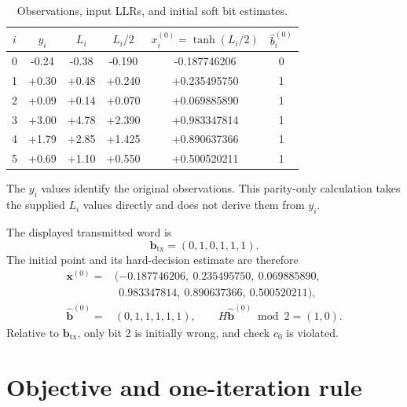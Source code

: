 \documentclass[11pt]{article}
\begin{document}
\begin{table}[H]
\centering
\small
\caption{Observations, input LLRs, and initial soft bit estimates.}
\label{tab:init}
\begin{tabular}{
  c
  S[table-format=+1.2]
  S[table-format=+1.2]
  S[table-format=+1.3]
  S[table-format=+1.9]
  c
}
\toprule
{$i$} & {$y_i$} & {$L_i$} & {$L_i/2$} & {$x_i^{(0)}=\tanh(L_i/2)$}
& {$\widehat b_i^{(0)}$} \\
 & -0.24 & -0.38 & -0.190 & -0.187746206 & 0 \\
1 & +0.30 & +0.48 & +0.240 & +0.235495750 & 1 \\
2 & +0.09 & +0.14 & +0.070 & +0.069885890 & 1 \\
3 & +3.00 & +4.78 & +2.390 & +0.983347814 & 1 \\
4 & +1.79 & +2.85 & +1.425 & +0.890637366 & 1 \\
5 & +0.69 & +1.10 & +0.550 & +0.500520211 & 1 \\
\bottomrule
\end{tabular}
\end{table}

The \(y_i\) values identify the original observations.  This parity-only
calculation takes the supplied \(L_i\) values directly and does not derive them
from \(y_i\).

The displayed transmitted word is
\begin{equation}
\boldsymbol b_{\mathrm{tx}}=(0,1,0,1,1,1).
\label{eq:tx-word}
\end{equation}
The initial point and its hard-decision estimate are therefore
\begin{align}
\boldsymbol{x}^{(0)}={}&(-0.187746206,\ 0.235495750,\ 0.069885890,\nonumber\\
&\phantom{(}0.983347814,\ 0.890637366,\ 0.500520211),\\
\widehat{\boldsymbol b}^{(0)}={}&(0,1,1,1,1,1),
\qquad
H\widehat{\boldsymbol b}^{(0)}\bmod 2=(1,0).
\label{eq:initial-state}
\end{align}
Relative to \(\boldsymbol b_{\mathrm{tx}}\), only bit 2 is initially wrong, and
check \(c_0\) is violated.

\section{Objective and one-iteration rule}
\end{document}
